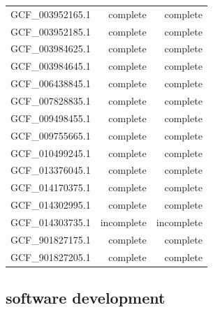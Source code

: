 \documentclass[sn-mathphys,Numbered]{sn-jnl}  %
\theoremstyle{thmstyleone}%
\theoremstyle{thmstyletwo}%
\theoremstyle{thmstylethree}%
\begin{document}
\begin{appendices}
\begin{table}[h!]
\begin{tabular}{rrr}
                GCF\_003952165.1 & complete               & complete               \\
                GCF\_003952185.1 & complete               & complete               \\
                GCF\_003984625.1 & complete               & complete               \\
                GCF\_003984645.1 & complete               & complete               \\
                GCF\_006438845.1 & complete               & complete               \\
                GCF\_007828835.1 & complete               & complete               \\
                GCF\_009498455.1 & complete               & complete               \\
                GCF\_009755665.1 & complete               & complete               \\
                GCF\_010499245.1 & complete               & complete               \\
                GCF\_013376045.1 & complete               & complete               \\
                GCF\_014170375.1 & complete               & complete               \\
                GCF\_014302995.1 & complete               & complete               \\
                GCF\_014303735.1 & incomplete             & incomplete             \\
                GCF\_901827175.1 & complete               & complete               \\
                GCF\_901827205.1 & complete               & complete              
                \end{tabular}
            \end{table}
    

    \subsection*{software development}
    \label{app:software}




\end{appendices}
\end{document}
